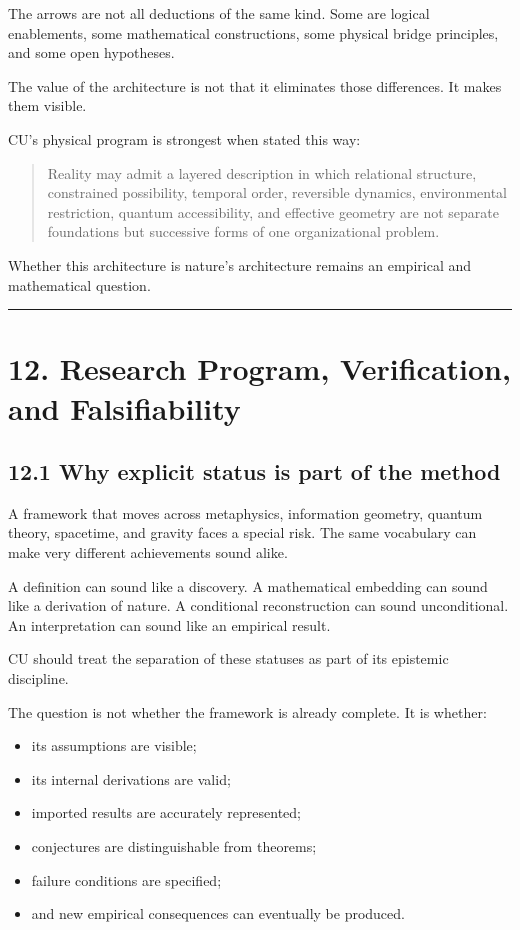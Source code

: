 \documentclass[
  11pt,
]{article}
\providecommand{\tightlist}{%
  \setlength{\itemsep}{0pt}\setlength{\parskip}{0pt}}
\begin{document}
The arrows are not all deductions of the same kind. Some are logical
enablements, some mathematical constructions, some physical bridge
principles, and some open hypotheses.

The value of the architecture is not that it eliminates those
differences. It makes them visible.

CU's physical program is strongest when stated this way:

\begin{quote}
Reality may admit a layered description in which relational structure,
constrained possibility, temporal order, reversible dynamics,
environmental restriction, quantum accessibility, and effective geometry
are not separate foundations but successive forms of one organizational
problem.
\end{quote}

Whether this architecture is nature's architecture remains an empirical
and mathematical question.

\begin{center}\rule{0.5\linewidth}{0.5pt}\end{center}

\section{12. Research Program, Verification, and
Falsifiability}\label{research-program-verification-and-falsifiability}

\subsection{12.1 Why explicit status is part of the
method}\label{why-explicit-status-is-part-of-the-method}

A framework that moves across metaphysics, information geometry, quantum
theory, spacetime, and gravity faces a special risk. The same vocabulary
can make very different achievements sound alike.

A definition can sound like a discovery. A mathematical embedding can
sound like a derivation of nature. A conditional reconstruction can
sound unconditional. An interpretation can sound like an empirical
result.

CU should treat the separation of these statuses as part of its
epistemic discipline.

The question is not whether the framework is already complete. It is
whether:

\begin{itemize}
\tightlist
\item
  its assumptions are visible;
\item
  its internal derivations are valid;
\item
  imported results are accurately represented;
\item
  conjectures are distinguishable from theorems;
\item
  failure conditions are specified;
\item
  and new empirical consequences can eventually be produced.
\end{itemize}
\end{document}
